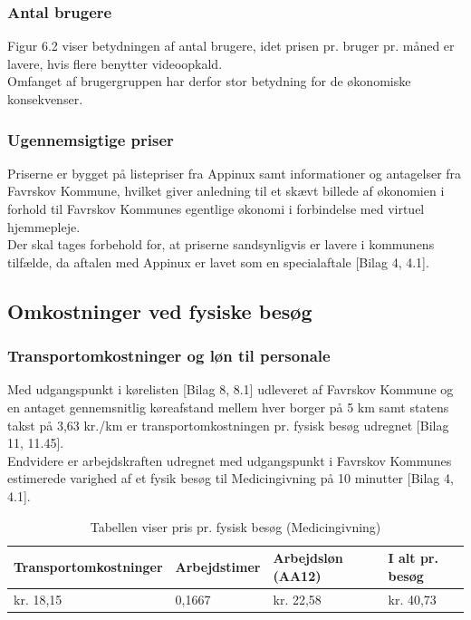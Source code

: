 \subsubsection{Antal brugere}
Figur 6.2 viser betydningen af antal brugere, idet prisen pr. bruger pr. måned er lavere, hvis flere benytter videoopkald. \\
Omfanget af brugergruppen har derfor stor betydning for de økonomiske konsekvenser. 

\subsubsection{Ugennemsigtige priser}
Priserne er bygget på listepriser fra Appinux samt informationer og antagelser fra Favrskov Kommune, hvilket giver anledning til et skævt billede af økonomien i forhold til Favrskov Kommunes egentlige økonomi i forbindelse med virtuel hjemmepleje. \\
Der skal tages forbehold for, at priserne sandsynligvis er lavere i kommunens tilfælde, da aftalen med Appinux er lavet som en specialaftale [Bilag 4, 4.1].\\


\subsection{Omkostninger ved fysiske besøg}
\subsubsection{Transportomkostninger og løn til personale}
Med udgangspunkt i kørelisten [Bilag 8, 8.1] udleveret af Favrskov Kommune og en antaget gennemsnitlig køreafstand mellem hver borger på 5 km samt statens takst på 3,63 kr./km er transportomkostningen pr. fysisk besøg udregnet [Bilag 11, 11.45].\\
Endvidere er arbejdskraften udregnet med udgangspunkt i Favrskov Kommunes estimerede varighed af et fysik besøg til Medicingivning på 10 minutter [Bilag 4, 4.1].

\begin{table}[H]
	\caption{Tabellen viser pris pr. fysisk besøg (Medicingivning)}
	\centering
	\label{tab:tabelfysiskbes}
	\begin{tabular}{|l|l|l|l|}
		\hline
		\textbf{Transportomkostninger} & \textbf{Arbejdstimer } & \textbf{Arbejdsløn (AA12)} & \textbf{I alt pr. besøg}\\ \hline
		kr. 18,15 & 0,1667 & kr. 22,58 & kr. 40,73\\ \hline
	\end{tabular}
\end{table}


